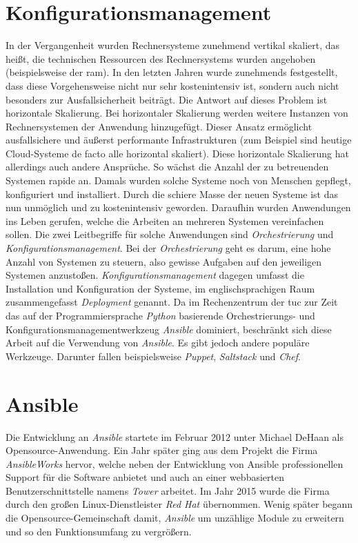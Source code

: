 \documentclass[titlepage]{report}
\begin{document}
\section*{Konfigurationsmanagement}
In der Vergangenheit wurden Rechnersysteme zunehmend vertikal skaliert,
das heißt, die technischen Ressourcen des Rechnersystems wurden angehoben
(beispielsweise der \gls{ram}). In den letzten Jahren wurde zunehmends
festgestellt, dass diese Vorgehensweise nicht nur sehr kostenintensiv
ist, sondern auch nicht besonders zur Ausfallsicherheit beiträgt. Die
Antwort auf dieses Problem ist horizontale Skalierung. Bei horizontaler
Skalierung werden weitere Instanzen von Rechnersystemen der Anwendung
hinzugefügt. Dieser Ansatz ermöglicht ausfallsichere und äußerst
performante Infrastrukturen (zum Beispiel sind heutige Cloud\hyp{}Systeme
de facto alle horizontal skaliert). Diese horizontale Skalierung hat
allerdings auch andere Ansprüche. So wächst die Anzahl der zu
betreuenden Systemen rapide an.  Damals wurden solche Systeme noch von
Menschen gepflegt, konfiguriert und installiert. Durch die schiere Masse
der neuen Systeme ist das nun unmöglich und zu kostenintensiv geworden.
Daraufhin wurden Anwendungen ins Leben gerufen, welche die Arbeiten an
mehreren Systemen vereinfachen sollen. Die zwei Leitbegriffe für solche
Anwendungen sind \emph{Orchestrierung} und
\emph{Konfigurationsmanagement}. Bei der \emph{Orchestrierung} geht es
darum, eine hohe Anzahl von Systemen zu steuern, also gewisse Aufgaben
auf den jeweiligen Systemen anzustoßen.  \emph{Konfigurationsmanagement}
dagegen umfasst die Installation und Konfiguration der Systeme, im
englischsprachigen Raum zusammengefasst \emph{Deployment} genannt. Da im
Rechenzentrum der \gls{tuc} zur Zeit das auf der Programmiersprache
\emph{Python} basierende Orchestrierungs\hyp{} und
Konfigurationsmanagementwerkzeug \emph{Ansible} dominiert, beschränkt
sich diese Arbeit auf die Verwendung von \emph{Ansible}. Es gibt jedoch
andere populäre Werkzeuge. Darunter fallen beispielsweise
\emph{Puppet}, \emph{Saltstack} und \emph{Chef}.
\section*{Ansible}
Die Entwicklung an \emph{Ansible} startete im Februar 2012 unter Michael
DeHaan als Opensource\hyp{}Anwendung\cite{ANSIBLE_ORIGINS}. Ein Jahr
später ging aus dem Projekt die Firma \emph{AnsibleWorks} hervor, welche
neben der Entwicklung von Ansible professionellen Support für die
Software anbietet und auch an einer webbasierten Benutzerschnittstelle
namens \emph{Tower} arbeitet\cite{ANSIBLEWORKS}. Im Jahr 2015 wurde die
Firma durch den großen Linux\hyp{}Dienstleister \emph{Red Hat}
übernommen\cite{ANSIBLEREDHAT}. Wenig später begann die
Opensource\hyp{}Gemeinschaft damit, \emph{Ansible} um unzählige Module zu
erweitern und so den Funktionsumfang zu vergrößern.
\end{document}
